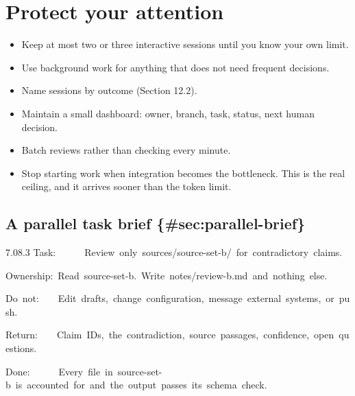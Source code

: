 \documentclass[11pt,a4paper,twoside,openany]{book}
\newcommand{\cl}[1]{\noindent\mbox{#1}\par}
\begin{document}
\FloatBarrier
\setcounter{section}{3}
\section{Protect your attention}

\begin{itemize}
\item Keep at most two or three interactive sessions until you know your own limit.
\item Use background work for anything that does not need frequent decisions.
\item Name sessions by outcome (Section 12.2).
\item Maintain a small dashboard: owner, branch, task, status, next human decision.
\item Batch reviews rather than checking every minute.
\item Stop starting work when integration becomes the bottleneck. This is the real ceiling, and it arrives sooner than the token limit.
\end{itemize}

\subsection*{A parallel task brief \{\#sec:parallel-brief\}}

\begin{codeblock}{7.0}{8.3}
\cl{Task:~~~~~~Review~only~sources/source-set-b/~for~contradictory~claims.}
\cl{Ownership:~Read~source-set-b.~Write~notes/review-b.md~and~nothing~else.}
\cl{Do~not:~~~~Edit~drafts,~change~configuration,~message~external~systems,~or~push.}
\cl{Return:~~~~Claim~IDs,~the~contradiction,~source~passages,~confidence,~open~questions.}
\cl{Done:~~~~~~Every~file~in~source-set-b~is~accounted~for~and~the~output~passes~its~schema~check.}
\end{codeblock}
\end{document}
